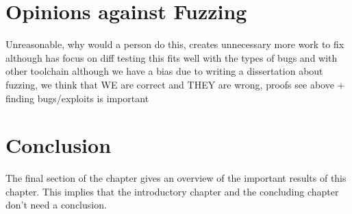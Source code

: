 \section{Opinions against Fuzzing}
\label{cha:2:againstFuzzing}
Unreasonable, why would a person do this, creates unnecessary more work to fix
\cite{39differentialTesting} although has focus on diff testing
this fits well with the types of bugs and with other toolchain
although we have a bias due to writing a dissertation about fuzzing, we think that WE are correct and THEY are wrong, proofs see above + finding bugs/exploits is important

\section{Conclusion}
\label{cha:2:conclusion}
The final section of the chapter gives an overview of the important results
of this chapter. This implies that the introductory chapter and the
concluding chapter don't need a conclusion.


